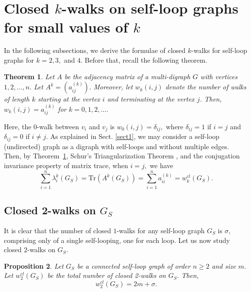 \documentclass[12pt,a4paper,reqno]{amsart}
\numberwithin{equation}{section}
\theoremstyle{plain}
\newtheorem{theorem}{Theorem}[section]
\newtheorem{proposition}[theorem]{Proposition}
\theoremstyle{definition}
\newcommand{\<}{\langle}
\renewcommand{\>}{\rangle}
\begin{document}
\vspace{-0.2em}
\section{Closed $k$-walks on self-loop graphs for small values of $k$}
\label{sect2}
In the following subsections, we derive the formulae of closed $k$-walks for self-loop graphs for $k=2,3,$ and $4.$   Before that, recall the following theorem.
\begin{theorem}
\label{digraphwalk}
\cite{cvetkovic1995spectra}
Let $A$ be the adjacency matrix of a multi-digraph $G$ with vertices $1, 2, \ldots, n.$ Let $A^k=(a^{(k)}_{ij}).$ Moreover, let $w_k(i,j)$ denote the number of walks of length $k$ starting at the vertex $i$ and terminating at the vertex $j$.  Then, $w_{k}(i,j)=a^{(k)}_{ij}$ for $k=0,1,2,\ldots.$       
\end{theorem}
Here, the $0$-walk between $v_i$ and $v_j$ is $w_0(i,j)=\delta_{ij},$ where $\delta_{ij}=1$ if $i=j$ and $\delta_{ij}=0$ if $i \neq j.$ As explained in Sect. \ref{sect1}, we may consider a self-loop (undirected) graph as a digraph with self-loops and without multiple edges. Then, by Theorem~\ref{digraphwalk}, Schur's Triangularization Theorem \cite{HornJohnson2013}, and the conjugation invariance property of matrix trace, when $i=j,$  we have 
\[
\sum^n_{i=1} \lambda^k_i(G_S)
= \mathrm{Tr}(A^k(G_S)) 
= \sum^n_{i=1} a^{(k)}_{ii} =w^{cl}_k(G_S).
\]
\subsection{Closed 2-walks on $G_S$} 
\label{sec2.1}
It is clear that the number of closed $1$-walks for any self-loop graph $G_S$ is $\sigma,$ comprising only of a single self-looping, one for each loop.  Let us now study closed $2$-walks on $G_S$.

\begin{proposition}
Let $G_S$ be a connected self-loop graph of order $n\geq 2$ and size $m.$ Let $w_2^{cl}(G_S)$ be the total number of closed 2-walks on $G_S.$ Then,
\begin{equation}
\label{eq:closed2}
w_2^{cl}(G_S)= 2m + \sigma.
\end{equation}
\end{proposition}
\end{document}

